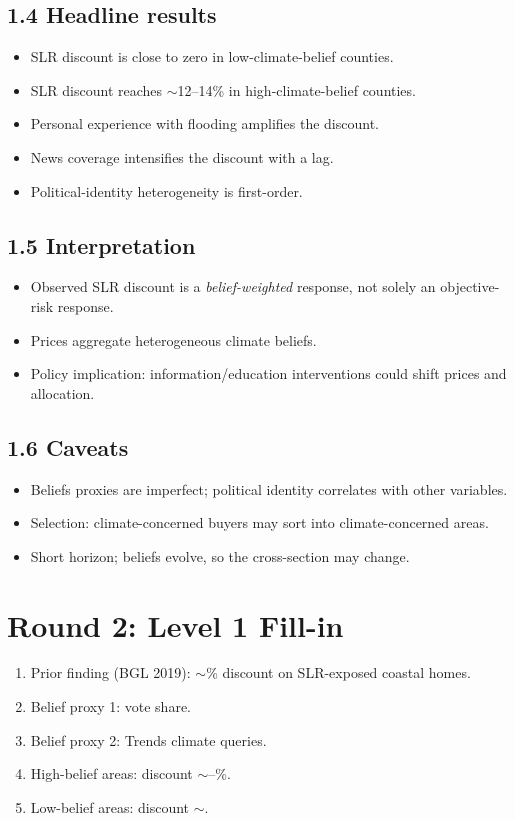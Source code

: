 \documentclass[11pt]{article}
\newcommand{\blank}[1]{\underline{\hspace{#1}}}
\begin{document}
\subsection*{1.4 Headline results}
\begin{itemize}
\item SLR discount is close to zero in low-climate-belief counties.
\item SLR discount reaches $\sim$12--14\% in high-climate-belief counties.
\item Personal experience with flooding amplifies the discount.
\item News coverage intensifies the discount with a lag.
\item Political-identity heterogeneity is first-order.
\end{itemize}

\subsection*{1.5 Interpretation}
\begin{itemize}
\item Observed SLR discount is a \emph{belief-weighted} response, not solely an objective-risk response.
\item Prices aggregate heterogeneous climate beliefs.
\item Policy implication: information/education interventions could shift prices and allocation.
\end{itemize}

\subsection*{1.6 Caveats}
\begin{alertbox}
\begin{itemize}
\item Beliefs proxies are imperfect; political identity correlates with other variables.
\item Selection: climate-concerned buyers may sort into climate-concerned areas.
\item Short horizon; beliefs evolve, so the cross-section may change.
\end{itemize}
\end{alertbox}

\section*{Round 2: Level 1 Fill-in}
\begin{enumerate}
\item Prior finding (BGL 2019): $\sim$\blank{1cm}\% discount on SLR-exposed coastal homes.
\item Belief proxy 1: \blank{2cm} vote share.
\item Belief proxy 2: \blank{2cm} Trends climate queries.
\item High-belief areas: discount $\sim$\blank{1cm}--\blank{1cm}\%.
\item Low-belief areas: discount $\sim$\blank{1cm}.
\end{enumerate}
\end{document}
